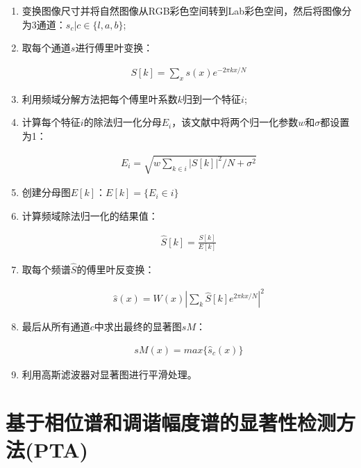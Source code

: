 \begin{enumerate}
\item 变换图像尺寸并将自然图像从RGB彩色空间转到Lab彩色空间，然后将图像分为3通道：$s_{c}|c\in\{l,a,b\}$;
\item 取每个通道$s$进行傅里叶变换：
\begin{linenomath}
\begin{align}
S[k]=\sum_{x}s(x)e^{-2\pi kx/N}
\label{式3_15}
\end{align}
\end{linenomath}
\item 利用频域分解方法把每个傅里叶系数$k$归到一个特征$i$;
\item 计算每个特征$i$的除法归一化分母$E_{i}$，该文献中将两个归一化参数$w$和$\sigma$都设置为1：
\begin{linenomath}
\begin{align}
E_{i}=\sqrt{w\sum_{k\in i}|S[k]|^{2}/N+\sigma^{2}}
\label{式3_16}
\end{align}
\end{linenomath}
\item 创建分母图$E[k]$：$E[k]=\{E_{i}\in i\}$
\item 计算频域除法归一化的结果值：
\begin{linenomath}
\begin{align}
\hat{S}[k]=\frac{S[k]}{E[k]}
\label{式3_17}
\end{align}
\end{linenomath}
\item 取每个频谱$\hat{S}$的傅里叶反变换：
\begin{linenomath}
\begin{align}
\hat{s}(x)=W(x)|\sum_{k}\hat{S}[k]e^{2\pi kx/N}|^{2}
\label{式3_18}
\end{align}
\end{linenomath}
\item 最后从所有通道$c$中求出最终的显著图$sM$：
\begin{linenomath}
\begin{align}
sM(x)=max\{\hat{s}_{c}(x)\}
\label{式3_19}
\end{align}
\end{linenomath}
\item 利用高斯滤波器对显著图进行平滑处理。
\end{enumerate}

\section{基于相位谱和调谐幅度谱的显著性检测方法(PTA)}
\label{3_4}

